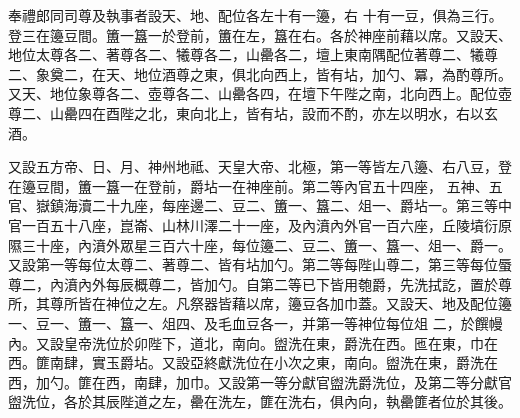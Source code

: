 \begin{pinyinscope}
 奉禮郎同司尊及執事者設天、地、配位各左十有一籩，右
 十有一豆，俱為三行。登三在籩豆間。簠一簋一於登前，簠在左，簋在右。各於神座前藉以席。又設天、地位太尊各二、著尊各二、犧尊各二，山罍各二，壇上東南隅配位著尊二、犧尊二、象奠二，在天、地位酒尊之東，俱北向西上，皆有坫，加勺、冪，為酌尊所。又天、地位象尊各二、壺尊各二、山罍各四，在壇下午陛之南，北向西上。配位壺尊二、山罍四在酉陛之北，東向北上，皆有坫，設而不酌，亦左以明水，右以玄酒。



 又設五方帝、日、月、神州地祗、天皇大帝、北極，第一等皆左八籩、右八豆，登在籩豆間，簠一簋一在登前，爵坫一在神座前。第二等內官五十四座，
 五神、五官、嶽鎮海瀆二十九座，每座邊二、豆二、簠一、簋二、俎一、爵坫一。第三等中官一百五十八座，崑崙、山林川澤二十一座，及內濆內外官一百六座，丘陵墳衍原隰三十座，內濆外眾星三百六十座，每位籩二、豆二、簠一、簋一、俎一、爵一。又設第一等每位太尊二、著尊二、皆有坫加勺。第二等每陛山尊二，第三等每位蜃尊二，內濆內外每辰概尊二，皆加勺。自第二等已下皆用匏爵，先洗拭訖，置於尊所，其尊所皆在神位之左。凡祭器皆藉以席，籩豆各加巾蓋。又設天、地及配位籩一、豆一、簠一、簋一、俎四、及毛血豆各一，并第一等神位每位俎
 二，於饌幔內。又設皇帝洗位於卯陛下，道北，南向。盥洗在東，爵洗在西。匜在東，巾在西。篚南肆，實玉爵坫。又設亞終獻洗位在小次之東，南向。盥洗在東，爵洗在西，加勺。篚在西，南肆，加巾。又設第一等分獻官盥洗爵洗位，及第二等分獻官盥洗位，各於其辰陛道之左，罍在洗左，篚在洗右，俱內向，執罍篚者位於其後。




\end{pinyinscope}
